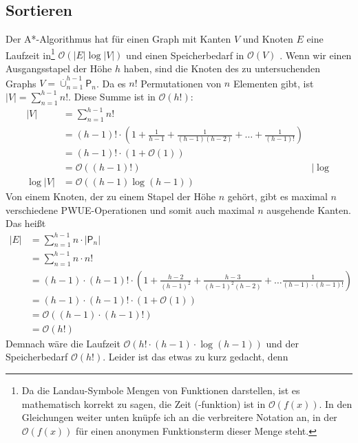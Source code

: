 \documentclass[a4paper,10pt,ngerman]{scrartcl}
\begin{document}
\subsection{Sortieren}
Der A*-Algorithmus hat für einen Graph mit Kanten $V$ und Knoten $E$ eine
Laufzeit in\footnote{Da die Landau-Symbole Mengen von Funktionen darstellen, ist es mathematisch korrekt zu sagen, die Zeit (-funktion) ist in $\mathcal{O}(f(x))$.
In den Gleichungen weiter unten knüpfe ich an die verbreitere Notation an, in der $\mathcal{O}(f(x))$ für einen anonymen Funktionsterm dieser Menge steht.} 
$\mathcal{O}(|E| \log |V|)$ und einen Speicherbedarf in
$\mathcal{O}(V)$ \cite[654]{sedgewick_wayne_2011}. Wenn wir einen
Ausgangsstapel der Höhe $h$ haben, sind die Knoten des zu untersuchenden Graphs
$V = \overset{.}\cup_{n=1}^{h-1} \mathsf{P}_n$. Da es $n!$ Permutationen von
$n$ Elementen gibt, ist $|V| = \sum_{n=1}^{h-1}n!$. Diese Summe ist in
$\mathcal{O}(h!)$:
\begin{align*}
  |V| & = \sum_{n=1}^{h-1}n!                                                                \\
      & = (h-1)! \cdot (1 + \frac{1}{h-1} + \frac{1}{(h-1)(h-2)} + \ldots + \frac{1}{(h-1)!}) \\
      & = (h-1)! \cdot (1 + \mathcal{O}(1))                                                   \\
      & = \mathcal{O}((h-1)!) & | \log \\
  \log |V| & = \mathcal{O}((h-1) \log (h-1))
\end{align*}
Von einem Knoten, der zu einem Stapel der Höhe $n$ gehört, gibt es maximal $n$ verschiedene PWUE-Operationen und somit auch maximal $n$ ausgehende Kanten. Das heißt
\begin{align*}
  |E| & = \sum_{n=1}^{h-1} n \cdot |\mathsf{P}_n|                                                   \\
      & = \sum_{n=1}^{h-1} n \cdot n!                                                               \\
      & = (h-1) \cdot (h-1)! \cdot (1 + \frac{h-2}{(h-1)^2} + \frac{h-3}{(h-1)^2(h-2)} + \ldots \frac{1}{(h-1) \cdot (h-1)!})\\
      & = (h-1) \cdot (h-1)! \cdot (1 + \mathcal{O}(1)) \\
      & = \mathcal{O}((h-1) \cdot (h-1)!) \\
      & = \mathcal{O}(h!)
\end{align*}
Demnach wäre die Laufzeit $\mathcal{O}(h! \cdot (h-1) \cdot \log (h-1))$ und der Speicherbedarf $\mathcal{O}(h!)$. Leider ist das etwas zu kurz gedacht, denn
\end{document}
